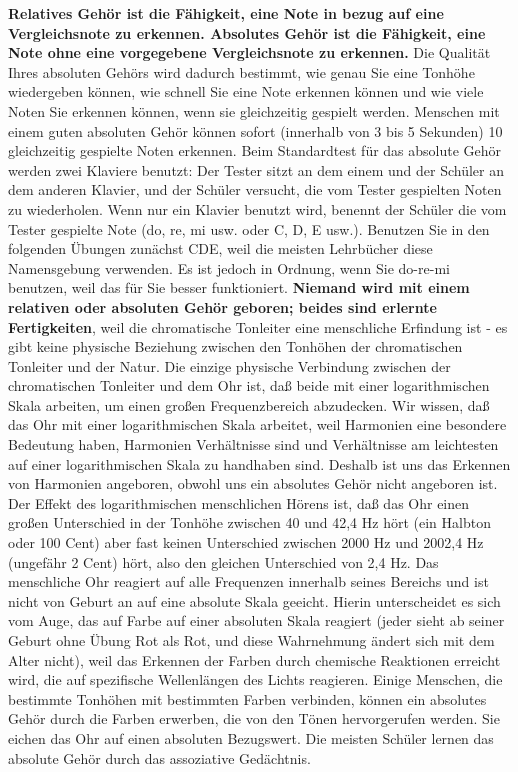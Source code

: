 \textbf{Relatives Gehör ist die Fähigkeit, eine Note in bezug auf eine Vergleichsnote zu erkennen.
Absolutes Gehör ist die Fähigkeit, eine Note ohne eine vorgegebene Vergleichsnote zu erkennen.}
Die Qualität Ihres absoluten Gehörs wird dadurch bestimmt, wie genau Sie eine Tonhöhe wiedergeben können, wie schnell Sie eine Note erkennen können und wie viele Noten Sie erkennen können, wenn sie gleichzeitig gespielt werden.
Menschen mit einem guten absoluten Gehör können sofort (innerhalb von 3 bis 5 Sekunden) 10 gleichzeitig gespielte Noten erkennen.
Beim Standardtest für das absolute Gehör werden zwei Klaviere benutzt: Der Tester sitzt an dem einem und der Schüler an dem anderen Klavier, und der Schüler versucht, die vom Tester gespielten Noten zu wiederholen.
Wenn nur ein Klavier benutzt wird, benennt der Schüler die vom Tester gespielte Note (do, re, mi usw. oder C, D, E usw.).
Benutzen Sie in den folgenden Übungen zunächst CDE, weil die meisten Lehrbücher diese Namensgebung verwenden.
Es ist jedoch in Ordnung, wenn Sie do-re-mi benutzen, weil das für Sie besser funktioniert.
\textbf{Niemand wird mit einem relativen oder absoluten Gehör geboren; beides sind erlernte Fertigkeiten}, weil die chromatische Tonleiter eine menschliche Erfindung ist - es gibt keine physische Beziehung zwischen den Tonhöhen der chromatischen Tonleiter und der Natur.
Die einzige physische Verbindung zwischen der chromatischen Tonleiter und dem Ohr ist, daß beide mit einer logarithmischen Skala arbeiten, um einen großen Frequenzbereich abzudecken.
Wir wissen, daß das Ohr mit einer logarithmischen Skala arbeitet, weil Harmonien eine besondere Bedeutung haben, Harmonien Verhältnisse sind und Verhältnisse am leichtesten auf einer logarithmischen Skala zu handhaben sind.
Deshalb ist uns das Erkennen von Harmonien angeboren, obwohl uns ein absolutes Gehör nicht angeboren ist.
Der Effekt des logarithmischen menschlichen Hörens ist, daß das Ohr einen großen Unterschied in der Tonhöhe zwischen 40 und 42,4 Hz hört (ein Halbton oder 100 Cent) aber fast keinen Unterschied zwischen 2000 Hz und 2002,4 Hz (ungefähr 2 Cent) hört, also den gleichen Unterschied von 2,4 Hz.
Das menschliche Ohr reagiert auf alle Frequenzen innerhalb seines Bereichs und ist nicht von Geburt an auf eine absolute Skala geeicht.
Hierin unterscheidet es sich vom Auge, das auf Farbe auf einer absoluten Skala reagiert (jeder sieht ab seiner Geburt ohne Übung Rot als Rot, und diese Wahrnehmung ändert sich mit dem Alter nicht), weil das Erkennen der Farben durch chemische Reaktionen erreicht wird, die auf spezifische Wellenlängen des Lichts reagieren.
Einige Menschen, die bestimmte Tonhöhen mit bestimmten Farben verbinden, können ein absolutes Gehör durch die Farben erwerben, die von den Tönen hervorgerufen werden.
Sie eichen das Ohr auf einen absoluten Bezugswert.
Die meisten Schüler lernen das absolute Gehör durch das assoziative Gedächtnis.

